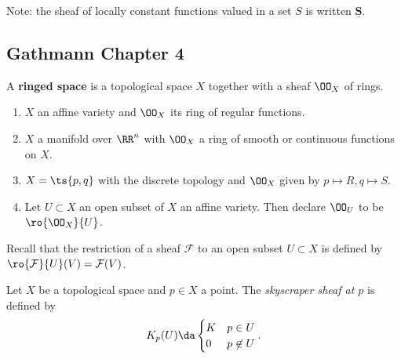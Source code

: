 Note: the sheaf of locally constant functions valued in a set \(S\) is
written \(\underline{\mathbf S}\).

\hypertarget{gathmann-chapter-4}{%
\subsection{Gathmann Chapter 4}\label{gathmann-chapter-4}}

\begin{definition}

A \textbf{ringed space} is a topological space \(X\) together with a
sheaf \(\OO_X\) of rings.

\end{definition}

\begin{example}

\envlist

\begin{enumerate}
\def\labelenumi{\arabic{enumi}.}
\item
  \(X\) an affine variety and \(\OO_X\) its ring of regular functions.
\item
  \(X\) a manifold over \(\RR^n\) with \(\OO_X\) a ring of smooth or
  continuous functions on \(X\).
\item
  \(X = \ts{p, q}\) with the discrete topology and \(\OO_X\) given by
  \(p\mapsto R, q\mapsto S\).
\item
  Let \(U\subset X\) an open subset of \(X\) an affine variety. Then
  declare \(\OO_U\) to be \(\ro{\OO_X}{U}\).
\end{enumerate}

\end{example}

Recall that the restriction of a sheaf \(\mathcal{F}\) to an open subset
\(U\subset X\) is defined by
\(\ro{\mathcal{F}}{U}(V) = \mathcal{F}(V)\).

\begin{example}

Let \(X\) be a topological space and \(p\in X\) a point. The
\emph{skyscraper sheaf at \(p\)} is defined by
\begin{align*}  
K_p(U) \da 
\begin{cases}
K & p\in U \\
0 & p\not\in U
\end{cases}
.\end{align*}

\end{example}

